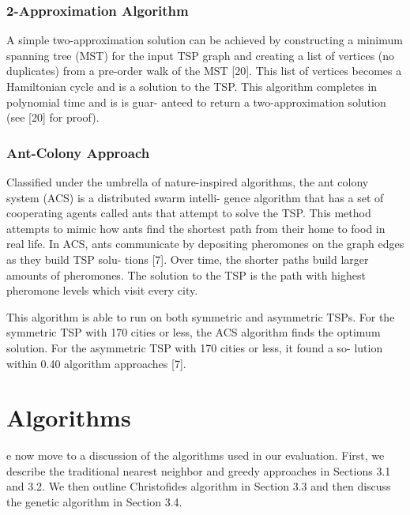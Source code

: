 \documentclass[10pt,twocolumn,letterpaper]{article}
\begin{document}
\subsubsection{2-Approximation Algorithm}
A simple two-approximation solution can be achieved by
constructing a minimum spanning tree (MST) for the input
TSP graph and creating a list of vertices (no duplicates)
from a pre-order walk of the MST [20]. This list of vertices
becomes a Hamiltonian cycle and is a solution to the TSP.
This algorithm completes in polynomial time and is is guar-
anteed to return a two-approximation solution (see [20] for
proof).

\subsubsection{Ant-Colony Approach}
Classified under the umbrella of nature-inspired algorithms,
the ant colony system (ACS) is a distributed swarm intelli-
gence algorithm that has a set of cooperating agents called
ants that attempt to solve the TSP. This method attempts
to mimic how ants find the shortest path from their home to
food in real life. In ACS, ants communicate by depositing
pheromones on the graph edges as they build TSP solu-
tions [7]. Over time, the shorter paths build larger amounts
of pheromones. The solution to the TSP is the path with
highest pheromone levels which visit every city.

This algorithm is able to run on both symmetric and
asymmetric TSPs. For the symmetric TSP with 170 cities
or less, the ACS algorithm finds the optimum solution. For
the asymmetric TSP with 170 cities or less, it found a so-
lution within 0.40%
algorithm approaches [7].
\section{Algorithms}
e now move to a discussion of the algorithms used in
our evaluation. First, we describe the traditional nearest
neighbor and greedy approaches in Sections 3.1 and 3.2. We
then outline Christofides algorithm in Section 3.3 and then
discuss the genetic algorithm in Section 3.4.
\end{document}
